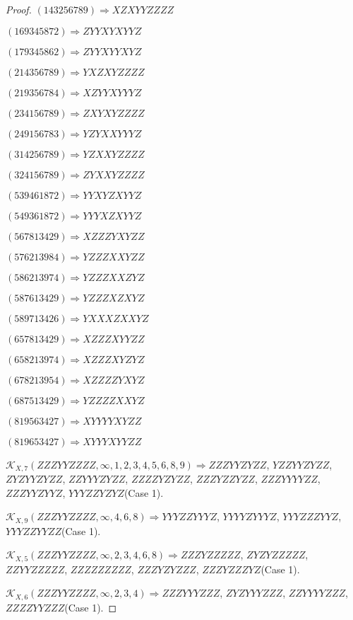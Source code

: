 \documentclass[12pt]{article}
\theoremstyle{plain}
\theoremstyle{definition}
\theoremstyle{remark}
\newcommand{\fancy}[1]{\mathcal{#1}}
\def\K{\fancy{K}}
\begin{document}
\begin{proof}
	$(1 4 3 2 5 6 7 8 9)\Rightarrow XZXYYZZZZ$
	
	$(1 6 9 3 4 5 8 7 2)\Rightarrow ZYYXYXYYZ$
	
	$(1 7 9 3 4 5 8 6 2)\Rightarrow ZYYXYYXYZ$
	
	$(2 1 4 3 5 6 7 8 9)\Rightarrow YXZXYZZZZ$
	
	$(2 1 9 3 5 6 7 8 4)\Rightarrow XZYYXYYYZ$
	
	$(2 3 4 1 5 6 7 8 9)\Rightarrow ZXYXYZZZZ$
	
	$(2 4 9 1 5 6 7 8 3)\Rightarrow YZYXXYYYZ$
	
	$(3 1 4 2 5 6 7 8 9)\Rightarrow YZXXYZZZZ$
	
	$(3 2 4 1 5 6 7 8 9)\Rightarrow ZYXXYZZZZ$
	
	$(5 3 9 4 6 1 8 7 2)\Rightarrow YYXYZXYYZ$
	
	$(5 4 9 3 6 1 8 7 2)\Rightarrow YYYXZXYYZ$
	
	$(5 6 7 8 1 3 4 2 9)\Rightarrow XZZZYXYZZ$
	
	$(5 7 6 2 1 3 9 8 4)\Rightarrow YZZZXXYZZ$
	
	$(5 8 6 2 1 3 9 7 4)\Rightarrow YZZZXXZYZ$
	
	$(5 8 7 6 1 3 4 2 9)\Rightarrow YZZZXZXYZ$
	
	$(5 8 9 7 1 3 4 2 6)\Rightarrow YXXXZXXYZ$
	
	$(6 5 7 8 1 3 4 2 9)\Rightarrow XZZZXYYZZ$
	
	$(6 5 8 2 1 3 9 7 4)\Rightarrow XZZZXYZYZ$
	
	$(6 7 8 2 1 3 9 5 4)\Rightarrow XZZZZYXYZ$
	
	$(6 8 7 5 1 3 4 2 9)\Rightarrow YZZZZXXYZ$
	
	$(8 1 9 5 6 3 4 2 7)\Rightarrow XYYYYXYZZ$
	
	$(8 1 9 6 5 3 4 2 7)\Rightarrow XYYYXYYZZ$
	
	
	
	$\K_{X,7}(ZZZYYZZZZ,\infty,1, 2, 3, 4, 5, 6, 8, 9)\Rightarrow $$ZZZYYZYZZ$, $YZZYYZYZZ$, $ZYZYYZYZZ$, $ZZYYYZYZZ$, $ZZZZYZYZZ$, $ZZZYZZYZZ$, $ZZZYYYYZZ$, $ZZZYYZYYZ$, $YYYZZYZYZ$(Case 1).
	
	$\K_{X,9}(ZZZYYZZZZ,\infty,4, 6, 8)\Rightarrow $$YYYZZYYYZ$, $YYYYZYYYZ$, $YYYZZZYYZ$, $YYYZZYYZZ$(Case 1).
	
	$\K_{X,5}(ZZZYYZZZZ,\infty,2, 3, 4, 6, 8)\Rightarrow $$ZZZYZZZZZ$, $ZYZYZZZZZ$, $ZZYYZZZZZ$, $ZZZZZZZZZ$, $ZZZYZYZZZ$, $ZZZYZZZYZ$(Case 1).
	
	$\K_{X,6}(ZZZYYZZZZ,\infty,2, 3, 4)\Rightarrow $$ZZZYYYZZZ$, $ZYZYYYZZZ$, $ZZYYYYZZZ$, $ZZZZYYZZZ$(Case 1).
	

\end{proof}
\end{document}
